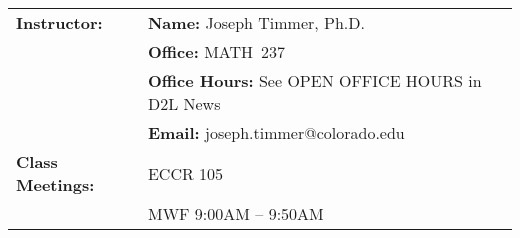 \documentclass[11pt]{article}
\begin{document}
\begin{longtable}{lp{5.2in}}
%
\textbf{Instructor:}
      & {\bf Name:}         \hspace{8.00ex} Joseph Timmer, Ph.D.
     \\
      & {\bf Office:}       \hspace{8.25ex} MATH~237
     \\
      & {\bf Office Hours:} \hspace{.20ex} See OPEN OFFICE HOURS in D2L News
     \\
      & {\bf Email:}        \hspace{8.00ex} joseph.timmer@colorado.edu
     \\[6pt]
%

\textbf{Class Meetings:}
     &    ECCR 105
     \\
     &    MWF 9:00\/AM -- 9:50\/AM 
   \\[6pt]


\end{longtable}
\end{document}
